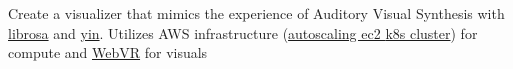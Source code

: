 {Create a visualizer that mimics the experience of Auditory Visual Synthesis with \href{https://librosa.org/}{librosa} and \href{http://audition.ens.fr/adc/pdf/2002_JASA_YIN.pdf}{yin}. Utilizes AWS infrastructure (\href{https://aws.amazon.com/ecs/}{autoscaling ec2 \href{https://docs.aws.amazon.com/eks/latest/userguide/what-is-eks.html}{k8s cluster}}) for compute and \href{https://developer.mozilla.org/en-US/docs/Games/Techniques/3D_on_the_web/WebVR}{WebVR} for visuals}
